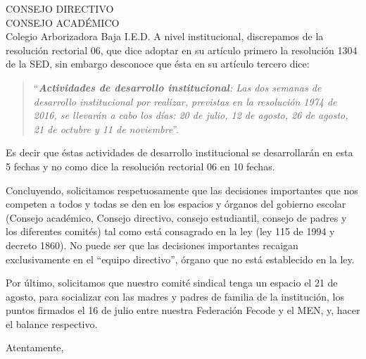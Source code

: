 \documentclass[letterpaper,spanish]{letter}
\begin{document}
\begin{letter}{CONSEJO DIRECTIVO\\CONSEJO ACADÉMICO\\Colegio Arborizadora Baja I.E.D.}
A nivel institucional, discrepamos de la resolución rectorial 06, que dice adoptar en su artículo primero la resolución 1304 de la SED, sin embargo desconoce que ésta en su artículo tercero dice: \begin{quotation}
``\textit{\textbf{Actividades de desarrollo institucional}: Las dos semanas de desarrollo institucional por realizar, previstas en la resolución 1974 de 2016, se llevarán a cabo los días: 20 de julio, 12 de agosto, 26 de agosto, 21 de octubre y 11 de noviembre}''.\end{quotation} Es decir que éstas actividades de desarrollo institucional se desarrollarán en esta 5 fechas y no como dice la resolución rectorial 06 en 10 fechas.

Concluyendo, solicitamos respetuosamente que las decisiones importantes que nos competen a todos y todas se den en los espacios y órganos del gobierno escolar (Consejo académico, Consejo directivo, consejo estudiantil, consejo de padres y los diferentes comités) tal como está consagrado en la ley (ley 115 de 1994 y decreto 1860). No puede ser que las decisiones importantes recaigan exclusivamente en el ``equipo directivo'', órgano que no está establecido en la ley.

Por último, solicitamos que nuestro comité sindical tenga un espacio el 21 de agosto, para socializar con las madres y padres de familia de la institución, los puntos firmados el 16 de julio entre nuestra Federación Fecode y el MEN, y, hacer el balance respectivo.
 
\closing{Atentamente,}


\end{letter}
\end{document}
